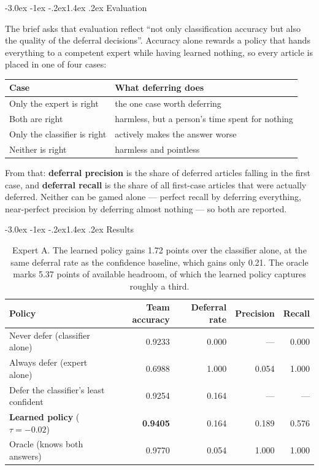 \documentclass[11pt,a4paper]{article}
\makeatletter
\renewcommand\subsection{\@startsection{subsection}{2}{\z@}%
  {-3.0ex \@plus -1ex \@minus -.2ex}{1.4ex \@plus .2ex}%
  {\normalfont\large\sffamily\bfseries\color{accent}}}
\makeatother
\begin{document}
\subsection{Evaluation}

The brief asks that evaluation reflect ``not only classification accuracy but
also the quality of the deferral decisions''. Accuracy alone rewards a policy
that hands everything to a competent expert while having learned nothing, so
every article is placed in one of four cases:

\begin{center}
\small
\begin{tabularx}{0.94\textwidth}{@{}lX@{}}
\toprule
\textbf{Case} & \textbf{What deferring does} \\
\midrule
Only the expert is right      & the one case worth deferring \\
Both are right                & harmless, but a person's time spent for nothing \\
Only the classifier is right  & actively makes the answer worse \\
Neither is right              & harmless and pointless \\
\bottomrule
\end{tabularx}
\end{center}

From that: \textbf{deferral precision} is the share of deferred articles falling
in the first case, and \textbf{deferral recall} is the share of all first-case
articles that were actually deferred. Neither can be gamed alone --- perfect
recall by deferring everything, near-perfect precision by deferring almost
nothing --- so both are reported.

\subsection{Results}

\begin{table}[H]
\centering
\small
\begin{tabular}{@{}lrrrr@{}}
\toprule
\textbf{Policy} & \textbf{Team accuracy} & \textbf{Deferral rate} & \textbf{Precision} & \textbf{Recall} \\
\midrule
Never defer (classifier alone)          & 0.9233 & 0.000 & --- & 0.000 \\
Always defer (expert alone)             & 0.6988 & 1.000 & 0.054 & 1.000 \\
Defer the classifier's least confident  & 0.9254 & 0.164 & --- & --- \\
\textbf{Learned policy} ($\tau = -0.02$) & \textbf{0.9405} & 0.164 & 0.189 & 0.576 \\
Oracle (knows both answers)             & 0.9770 & 0.054 & 1.000 & 1.000 \\
\bottomrule
\end{tabular}
\caption{Expert A. The learned policy gains 1.72 points over the classifier
alone, at the same deferral rate as the confidence baseline, which gains only
0.21. The oracle marks 5.37 points of available headroom, of which the learned
policy captures roughly a third.}
\label{tab:defer}
\end{table}
\end{document}
